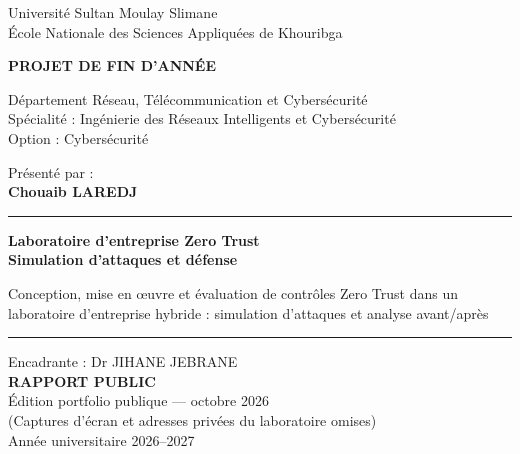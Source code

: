 \documentclass[a4paper,12pt]{report}
\begin{document}
\begin{titlepage}
\thispagestyle{empty}
\begin{center}
\vspace{.6cm}
{\large Université Sultan Moulay Slimane\\École Nationale des Sciences Appliquées de Khouribga\par}
\vspace{.7cm}
{\Large\bfseries PROJET DE FIN D'ANNÉE\par}
\vspace{.4cm}
Département Réseau, Télécommunication et Cybersécurité\\
Spécialité : Ingénierie des Réseaux Intelligents et Cybersécurité\\
Option : Cybersécurité
\vspace{.6cm}

Présenté par :\\{\Large\bfseries Chouaib LAREDJ}
\vspace{.6cm}

\rule{\textwidth}{.4pt}
\vspace{.2cm}

{\Large\bfseries Laboratoire d'entreprise Zero Trust\\Simulation d'attaques et défense\par}
\vspace{.3cm}
{\normalsize Conception, mise en œuvre et évaluation de contrôles Zero Trust dans un laboratoire d'entreprise hybride : simulation d'attaques et analyse avant/après\par}
\vspace{.2cm}
\rule{\textwidth}{.4pt}
\vspace{.6cm}

Encadrante : Dr JIHANE JEBRANE\\
\vfill
{\large\bfseries RAPPORT PUBLIC}\\[0.2cm]
{\small Édition portfolio publique — octobre 2026\\
(Captures d'écran et adresses privées du laboratoire omises)}\\
\vspace{.4cm}
Année universitaire 2026--2027
\end{center}
\end{titlepage}
\hypersetup{pageanchor=true}
\end{document}
